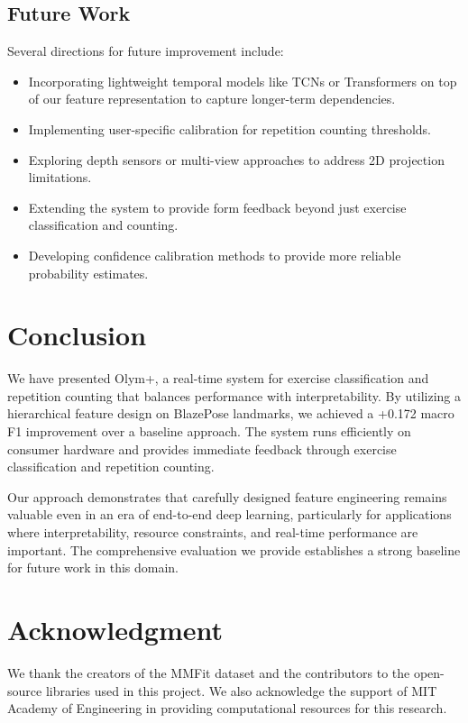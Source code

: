 \documentclass[conference]{IEEEtran}
\begin{document}
\subsection{Future Work}
Several directions for future improvement include:
\begin{itemize}
    \item Incorporating lightweight temporal models like TCNs or Transformers on top of our feature representation to capture longer-term dependencies.
    \item Implementing user-specific calibration for repetition counting thresholds.
    \item Exploring depth sensors or multi-view approaches to address 2D projection limitations.
    \item Extending the system to provide form feedback beyond just exercise classification and counting.
    \item Developing confidence calibration methods to provide more reliable probability estimates.
\end{itemize}

\section{Conclusion}
We have presented Olym+, a real-time system for exercise classification and repetition counting that balances performance with interpretability. By utilizing a hierarchical feature design on BlazePose landmarks, we achieved a +0.172 macro F1 improvement over a baseline approach. The system runs efficiently on consumer hardware and provides immediate feedback through exercise classification and repetition counting.

Our approach demonstrates that carefully designed feature engineering remains valuable even in an era of end-to-end deep learning, particularly for applications where interpretability, resource constraints, and real-time performance are important. The comprehensive evaluation we provide establishes a strong baseline for future work in this domain.

\section*{Acknowledgment}
We thank the creators of the MMFit dataset and the contributors to the open-source libraries used in this project. We also acknowledge the support of MIT Academy of Engineering in providing computational resources for this research.
\end{document}
